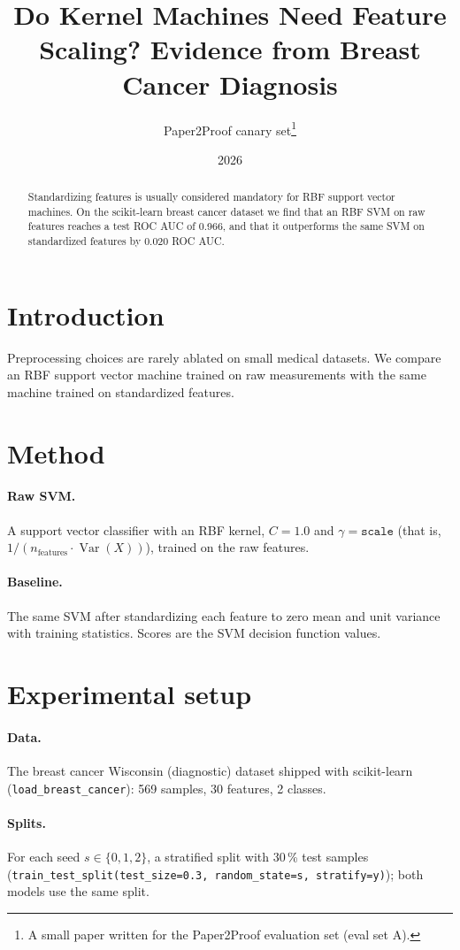 \documentclass[11pt]{article}
\title{Do Kernel Machines Need Feature Scaling? Evidence from Breast Cancer Diagnosis}
\author{Paper2Proof canary set\thanks{A small paper written for the Paper2Proof evaluation set (eval set A).}}
\date{2026}
\begin{document}
\maketitle

\begin{abstract}
Standardizing features is usually considered mandatory for RBF support vector machines. On the
scikit-learn breast cancer dataset we find that an RBF SVM on raw features reaches a test ROC AUC
of 0.966, and that it outperforms the same SVM on standardized features by 0.020 ROC AUC.
\end{abstract}

\section{Introduction}
Preprocessing choices are rarely ablated on small medical datasets. We compare an RBF support
vector machine trained on raw measurements with the same machine trained on standardized
features.

\section{Method}
\paragraph{Raw SVM.} A support vector classifier with an RBF kernel, $C = 1.0$ and
$\gamma = \texttt{scale}$ (that is, $1 / (n_\text{features} \cdot \operatorname{Var}(X))$),
trained on the raw features.
\paragraph{Baseline.} The same SVM after standardizing each feature to zero mean and unit
variance with training statistics.
Scores are the SVM decision function values.

\section{Experimental setup}
\paragraph{Data.} The breast cancer Wisconsin (diagnostic) dataset shipped with scikit-learn
(\texttt{load\_breast\_cancer}): 569 samples, 30 features, 2 classes.
\paragraph{Splits.} For each seed $s \in \{0, 1, 2\}$, a stratified split with 30\,\% test
samples (\texttt{train\_test\_split(test\_size=0.3, random\_state=s, stratify=y)}); both models
use the same split.
\end{document}
